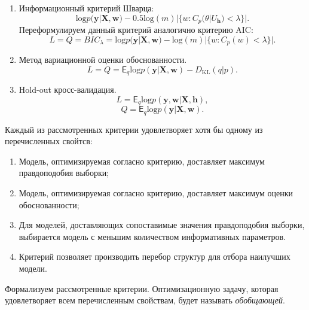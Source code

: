 \begin{enumerate}
\item Информационный критерий Шварца:
\[
    \text{log}p(\mathbf{y}|\mathbf{X}, \mathbf{w}) - 0.5\text{log}(m)|\{w: C_p(\theta|U_\mathbf{h})<\lambda\}|.
\]
Переформулируем данный критерий аналогично критерию AIC:
\begin{equation}
\label{eq:optim_bic}
    L = Q = BIC_{\lambda} = \text{log}p(\mathbf{y}|\mathbf{X}, \mathbf{w}) - \text{log}(m)|\{w: C_p(w)<\lambda\}|.
\end{equation}


\item Метод вариационной оценки обоснованности.
\begin{equation}
\label{eq:optim_elbo_method}
    L = Q = \mathsf{E}_q \text{log}p(\mathbf{y}|\mathbf{X}, \mathbf{w}) - D_\text{KL}(q|p).
\end{equation}


\item Hold-out кросс-валидация.
\begin{equation}
\label{eq:optim_hold_out}
    L = \mathsf{E}_q \text{log}p(\mathbf{y}, \mathbf{w}|\mathbf{X}, \mathbf{h}),
\end{equation}
\[
    Q = \mathsf{E}_q \text{log}p(\mathbf{y}|\mathbf{X}, \mathbf{w}).
\]


\end{enumerate}

Каждый из рассмотренных критерии удовлетворяет хотя бы одному из перечисленных свойтсв:
\begin{enumerate}
\item Модель, оптимизируемая согласно критерию, доставляет максимум правдоподобия выборки;
\item Модель, оптимизируемая согласно критерию, доставляет максимум оценки обоснованности;
\item Для моделей, доставляющих сопоставимые значения правдоподобия выборки, выбирается модель с меньшим количеством информативных параметров.
\item Критерий позволяет производить перебор структур для отбора наилучших модели.
\end{enumerate}

Формализуем рассмотренные критерии. Оптимизационную задачу, которая удовлетворяет всем перечисленным свойствам, будет называть \textit{обобщающей}.

